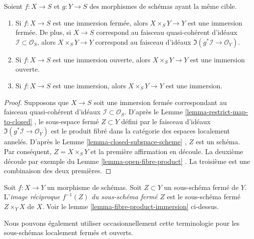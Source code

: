 \begin{lemma}
\label{lemma-fibre-product-immersion}
Soient  $f : X \to S$  et  $g : Y \to S$  des morphismes de schémas ayant la même cible.
\begin{enumerate}
\item Si  $f : X \to S$  est une immersion fermée, alors  $X \times_S Y \to Y$  est une immersion
fermée. De plus, si  $X \to S$  correspond au faisceau quasi-cohérent d'idéaux
 $\mathcal{I} \subset \mathcal{O}_S$, alors  $X \times_S Y \to Y$  correspond au faisceau d'idéaux  $\Im(g^*\mathcal{I} \to \mathcal{O}_Y)$.
\item Si  $f : X \to S$  est une immersion ouverte, alors  $X \times_S Y \to Y$  est une immersion
ouverte.
\item Si  $f : X \to S$  est une immersion, alors  $X \times_S Y \to Y$  est une immersion.
\end{enumerate}
\end{lemma}

\begin{proof}
Supposons que  $X \to S$  soit une immersion fermée correspondant au faisceau
quasi-cohérent d'idéaux  $\mathcal{I} \subset \mathcal{O}_S$. D'après le Lemme  \ref{lemma-restrict-map-to-closed} , le
sous-espace fermé  $Z \subset Y$  défini par le faisceau d'idéaux  $\Im(g^*\mathcal{I} \to \mathcal{O}_Y)$  est le
produit fibré dans la catégorie des espaces localement annelés. D'après le Lemme
 \ref{lemma-closed-subspace-scheme} ,  $Z$  est un schéma. Par conséquent,  $Z = X \times_S Y$  et la
première affirmation en découle. La deuxième découle par exemple du Lemme
 \ref{lemma-open-fibre-product} . La troisième est une combinaison des deux premières.
\end{proof}

\begin{definition}
\label{definition-inverse-image-closed-subscheme}
Soit $f : X \to Y$ un morphisme de schémas. Soit $Z \subset Y$ un
sous-schéma fermé de $Y$. L'{\it image
réciproque $f^{-1}(Z)$  du sous-schéma fermé  $Z$} est le
sous-schéma fermé $Z \times_Y X$  de  $X$. Voir le lemme \ref{lemma-fibre-product-immersion} ci-dessus.
\end{definition}

\noindent
Nous pouvons également utiliser occasionnellement cette terminologie pour les
sous-schémas localement fermés et ouverts.









